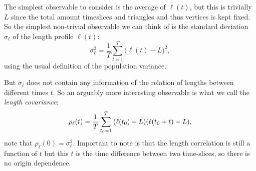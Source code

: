 The simplest observable to consider is the average of $\ell(t)$, but this is trivially $L$ since the total amount timeslices and triangles and thus vertices is kept fixed.
So the simplest non-trivial observable we can think of is the standard deviation $\sigma_\ell$ of the length profile $\ell(t)$:
\begin{equation}\label{eq:std_meas}
    \sigma_\ell^2 = \frac{1}{T} \sum_{t = 1}^{T} \Big(\ell(t) - L\Big)^2,
\end{equation}
using the usual definition of the population variance.

But $\sigma_\ell$ does not contain any information of the relation of lengths between different times $t$.
So an arguably more interesting observable is what we call the \emph{length covariance}:
\begin{equation}\label{eq:cov_meas}
    \rho_\ell(t) = \frac{1}{T} \sum_{t_0 = 1}^{T} \qty(\ell(t_0) - L)\qty(\ell(t_0 + t) - L),
\end{equation}
note that $\rho_\ell(0) = \sigma_\ell^2$.
Important to note is that the length correlation is still a function of $t$ but this $t$ is the time difference between two time-slices, so there is no origin dependence.